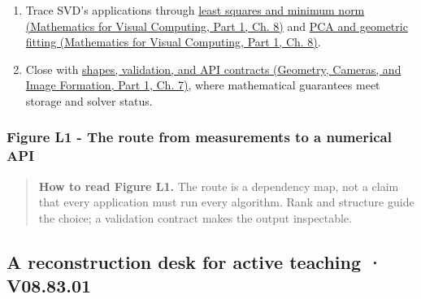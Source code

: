 \begin{enumerate}
\item
  Trace SVD's applications through \href{../02-Mathematics-for-Visual-Computing-P01/main.pdf\#02-foundations-ii-ch024-least-squares-from-decoupling-then-minimum-norm}{least squares and minimum norm (Mathematics for Visual Computing, Part 1, Ch. 8)} and \href{../02-Mathematics-for-Visual-Computing-P01/main.pdf\#02-foundations-ii-ch024-centered-measurements-reveal-principal-directions}{PCA and geometric fitting (Mathematics for Visual Computing, Part 1, Ch. 8)}.
\item
  Close with \href{../03-Geometry-Cameras-and-Image-Formation-P01/main.pdf\#02-foundations-ii-ch038-an-svd-api-begins-with-shapes-and-guarantees}{shapes, validation, and API contracts (Geometry, Cameras, and Image Formation, Part 1, Ch. 7)}, where mathematical guarantees meet storage and solver status.
\end{enumerate}

\subsubsection{Figure L1 - The route from measurements to a numerical API}\label{02-foundations-ii-ch039-figure-l1---the-route-from-measurements-to-a-numerical-api}

\hypertarget{02-foundations-ii-ch039-figure-l1---the-route-from-measurements-to-a-numerical-api}{}


\begin{quote}
\textbf{How to read Figure L1.} The route is a dependency map, not a claim that every application must run every algorithm. Rank and structure guide the choice; a validation contract makes the output inspectable.
\end{quote}

\subsection{A reconstruction desk for active teaching · V08.83.01}\label{02-foundations-ii-ch039-a-reconstruction-desk-for-active-teaching-v08.83.01}

\hypertarget{02-foundations-ii-ch039-a-reconstruction-desk-for-active-teaching-v08.83.01}{}

